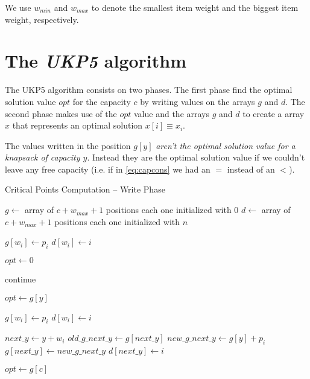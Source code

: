 \documentclass[12pt]{article}
\begin{document}
We use \(w_{min}\) and \(w_{max}\) to denote the smallest item weight and the biggest item weight, respectively.

\section{The \textit{UKP5} algorithm}

The UKP5 algorithm consists on two phases. The first phase find the optimal solution value \(opt\) for the capacity \(c\) by writing values on the arrays \(g\) and \(d\). The second phase makes use of the \(opt\) value and the arrays \(g\) and \(d\) to create a array \(x\) that represents an optimal solution \(x[i] \equiv x_i\).

The values written in the position \(g[y]\) \emph{aren't the optimal solution value for a knapsack of capacity \(y\)}. Instead they are the optimal solution value if we couldn't leave any free capacity (i.e. if in \eqref{eq:capcons} we had an \(=\) instead of an \(<\)).

\begin{algorithm}
\caption{Critical Points Computation -- Write Phase}\label{alg:ukp6_write_phase}
\begin{algorithmic}[1]
  \State \(g \gets\) array of \(c + w_{max} + 1\) positions each one initialized with \(0\)
  \State \(d \gets\) array of \(c + w_{max} + 1\) positions each one initialized with \(n\)
  
      \State \(g[w_i] \gets p_i\)
      \State \(d[w_i] \gets i\)
    \EndIf
  \EndFor

  \State \(opt \gets 0\)

    	\State continue
    \EndIf
    
    \State \(opt \gets g[y]\)
    
        \State \(g[w_i] \gets p_i\)
        \State \(d[w_i] \gets i\)
      \EndIf

      \State \(next\_y \gets y + w_i\)
      \State \(old\_g\_next\_y \gets g[next\_y]\)
      \State \(new\_g\_next\_y \gets g[y] + p_i\)
        \State \(g[next\_y] \gets new\_g\_next\_y\)
        \State \(d[next\_y] \gets i\)
      \EndIf
    \EndFor
  \EndFor

    \State \(opt \gets g[c]\)
  \EndIf
\EndProcedure
\end{algorithmic}
\end{algorithm}
\end{document}
